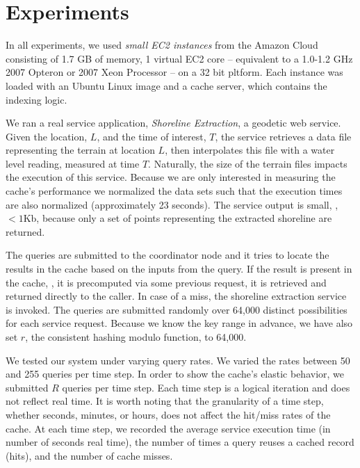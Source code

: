 
\section{Experiments} %
\label{sec:experiments_indexing}
In all experiments, we used \emph{small EC2 instances} from the Amazon Cloud
consisting of 1.7 GB of memory, 1 virtual EC2 core -- equivalent to a 1.0-1.2
GHz 2007 Opteron or 2007 Xeon Processor -- on a 32 bit pltform. Each instance
was loaded with an Ubuntu Linux image and a cache server, which contains the
indexing logic.

We ran a real service application, \emph{Shoreline Extraction}, a geodetic web
service. Given the location, $L$, and the time of interest, $T$, the service
retrieves a data file representing the terrain at location $L$, then
interpolates this file with a water level reading, measured at time $T$.
Naturally, the size of the terrain files impacts the execution of this service.
Because we are only interested in measuring the cache's performance we
normalized the data sets such that the execution times are also normalized
(approximately 23 seconds). The service output is small, \eg, $< 1$Kb,
because only a set of points representing the extracted shoreline are returned.

The queries are submitted to the coordinator node and it tries to locate the
results in the cache based on the inputs from the query. If the result is
present in the cache, \ie, it is precomputed via some previous request, it is
retrieved and returned directly to the caller. In case of a miss, the shoreline
extraction service is invoked. The queries are submitted randomly over 64,000
distinct possibilities for each service request. Because we know the key range
in advance, we have also set $r$, the consistent hashing modulo function, to
64,000.

We tested our system under varying query rates. We varied the rates between 50
and 255 queries per time step.  In order to show the cache's elastic behavior,
we submitted $R$ queries per time step. Each time step is a logical iteration
and does not reflect real time. It is worth noting that the granularity of a
time step, whether seconds, minutes, or hours, does not affect the hit/miss
rates of the cache. At each time step, we recorded the average service
execution time (in number of seconds real time), the number of times a query
reuses a cached record (hits), and the number of cache misses.

